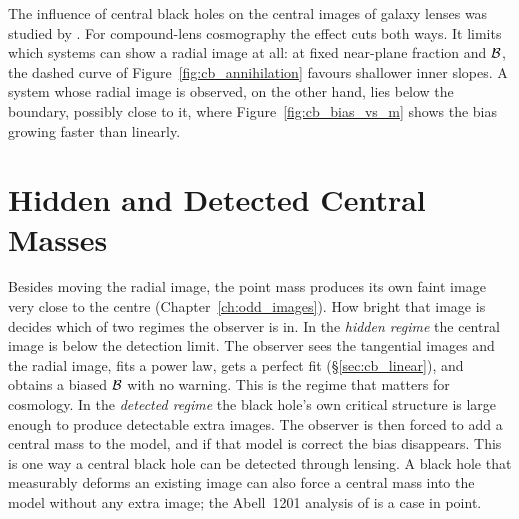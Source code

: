 \begin{remark}
The influence of central black holes on the central images of galaxy
lenses was studied by \citet{mao_witt_koopmans_2001}. For compound-lens
cosmography the effect cuts both ways. It limits which systems
can show a radial image at all: at fixed near-plane fraction and
$\mathcal{B}$, the dashed curve of Figure~\ref{fig:cb_annihilation} favours
shallower inner slopes. A system whose radial image is observed, on
the other hand, lies below the boundary, possibly close to it, where
Figure~\ref{fig:cb_bias_vs_m} shows the bias growing faster than
linearly.
\end{remark}


\section{Hidden and Detected Central Masses}
\label{sec:cb_regimes}

Besides moving the radial image, the point mass produces its own faint
image very close to the centre (Chapter~\ref{ch:odd_images}). How bright
that image is decides which of two regimes the observer is in. In the
\emph{hidden regime} the central image is below the detection limit.
The observer sees the tangential images and the radial image, fits a
power law, gets a perfect fit (\S\ref{sec:cb_linear}), and obtains a
biased $\mathcal{B}$ with no warning. This is the regime that matters for
cosmology. In the \emph{detected regime} the black hole's own critical
structure is large enough to produce detectable extra images. The
observer is then forced to add a central mass to the model, and if that
model is correct the bias disappears. This is one way a central black
hole can be detected through lensing. A black hole that measurably
deforms an existing image can also force a central mass into the model
without any extra image; the Abell~1201 analysis of
\citet{nightingale_2023} is a case in point.


